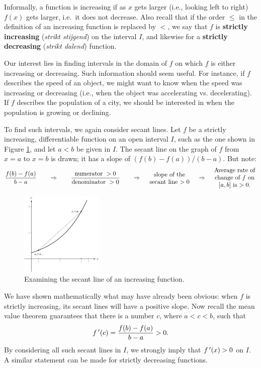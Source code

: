 Informally, a function is increasing if as $x$ gets larger (i.e., looking left to right) $f(x)$ gets larger, i.e.\ it does not decrease. Also recall that if the order $\leq$ in the definition of an increasing function is replaced by $<$,  we say that $f$ is \textbf{strictly increasing} (\textit{strikt stijgend}) on the interval $I$, and likewise for a \textbf{strictly decreasing} (\textit{strikt dalend}) function.

Our interest lies in finding intervals in the domain of $f$ on which $f$ is either increasing or decreasing. Such information should seem useful. For instance, if $f$ describes the speed of an object, we might want to know when the speed was increasing or decreasing (i.e., when the object was accelerating vs. decelerating). If $f$ describes the population of a city, we should be interested in when the population is growing or declining.

To find such intervals, we again consider secant lines. Let $f$ be a strictly increasing, differentiable function on an open interval $I$, such as the one shown in Figure \ref{fig_behaviour_9}, and let $a<b$ be given in $I$. The secant line on the graph of $f$ from $x=a$ to $x=b$ is drawn; it has a slope of $(f(b)-f(a))/(b-a)$. But note:
$$
\frac{f(b)-f(a)}{b-a} \qquad\Rightarrow\qquad \frac{\text{numerator }>0}{\text{denominator } >0} \qquad\Rightarrow\quad \parbox{70pt}{\centering slope of the secant line $>0$}
\quad\Rightarrow\quad \parbox{70pt}{\centering Average rate of change of $f$ on $[a,b]$ is $>0$.}$$


\begin{figure}[h]
	\begin{center}
			\includegraphics[width=0.35\textwidth]{fig_behaviour_9}
	\caption{Examining the secant line of an increasing function.}
	\label{fig_behaviour_9}
	\end{center}
\end{figure}


We have shown mathematically what may have already been obvious: when $f$ is strictly increasing, its secant lines will have a positive slope. Now recall the mean value theorem guarantees that there is a number $c$, where $a<c<b$, such that $$f\,'(c) = \frac{f(b)-f(a)}{b-a}>0.$$ By considering all such secant lines in $I$, we strongly imply that $f\,'(x) > 0$ on $I$. A similar statement can be made for strictly decreasing functions.

